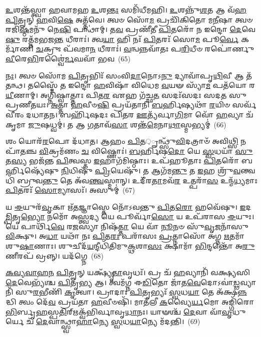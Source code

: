{\anuvakamend[{\-\ul{𑌯}\-𑌜𑍍𑌞𑌮\-\ul{𑌮𑍈}\-𑌰𑌧𑌿᳴ 𑌵𑍃\-\ul{𑌷}\-𑌨𑍍𑌨𑍇\-\ul{𑌕𑌾}\-𑌨𑍍𑌨𑌵𑌿𑍞᳴\-\ul{𑌶}\-𑌤𑌿𑌶𑍍𑌚᳴}]}%

\-\ul{𑌉}\-𑌶𑌨𑍍𑌤᳴𑌸𑍍𑌤𑍍𑌵𑌾 𑌹𑌵𑌾𑌮𑌹 \ul{𑌉}\-𑌶\-\ul{𑌨𑍍𑌤𑌃} 𑌸𑌮𑌿᳴𑌧𑍀𑌮𑌹𑌿। \ul{𑌉}\-𑌶𑌨𑍍𑌨𑍁᳴\-\ul{𑌶}\-𑌤 𑌆 𑌵᳴\-\ul{𑌹} \ul{𑌪𑌿}\-𑌤𑍄𑌨𑍍 \ul{𑌹}\-𑌵𑌿\-\ul{𑌷𑍇} 𑌅𑌤𑍍𑌤᳴𑌵𑍇। 𑌤𑍍𑌵𑍞 𑌸𑍋᳴\-\ul{𑌮} 𑌪𑍍𑌰𑌚𑌿᳴𑌕𑌿𑌤𑍋 𑌮\-\ul{𑌨𑍀}\-𑌷𑌾 𑌤𑍍𑌵𑍞 𑌰𑌜𑌿᳴\-\ul{𑌷𑍍𑌠}\-𑌮𑌨𑍁᳴ 𑌨𑍇\-\ul{𑌷𑌿} 𑌪𑌨𑍍𑌥𑌾॑𑌮𑍍। 𑌤\-\ul{𑌵} 𑌪𑍍𑌰𑌣𑍀᳴𑌤𑍀 \ul{𑌪𑌿}\-𑌤𑌰𑍋᳴ 𑌨 𑌇𑌨𑍍𑌦𑍋 \ul{𑌦𑍇}\-𑌵𑍇\-\ul{𑌷𑍁} 𑌰𑌤𑍍𑌨᳴𑌮𑌭𑌜\-\ul{𑌨𑍍𑌤} 𑌧𑍀𑌰𑌾𑌃॑। 𑌤𑍍𑌵\-\ul{𑌯𑌾} 𑌹𑌿 𑌨𑌃᳴ \ul{𑌪𑌿}\-𑌤𑌰𑌃᳴ 𑌸𑍋\-\ul{𑌮} 𑌪𑍂\-\ul{𑌰𑍍𑌵𑍇} 𑌕𑌰𑍍𑌮𑌾᳴𑌣𑌿 \ul{𑌚}\-𑌕𑍍𑌰𑍁𑌃 𑌪᳴𑌵𑌮𑌾\-\ul{𑌨} 𑌧𑍀𑌰𑌾𑌃॑। \ul{𑌵}\-𑌨𑍍𑌵𑌨𑍍𑌨𑌵𑌾᳴𑌤𑌃 𑌪\-\ul{𑌰𑌿}\-𑌧𑍀𑍞 𑌰𑌪𑍋॑𑌰𑍍𑌣𑍁 \ul{𑌵𑍀}\-𑌰𑍇\-\ul{𑌭𑌿}\-𑌰𑌶𑍍𑌵𑍈॑\-\ul{𑌰𑍍𑌮}\-𑌘𑌵𑌾᳴ 𑌭𑌵~(65)

\-\ul{𑌨𑌃}\-। 𑌤𑍍𑌵𑍞 𑌸𑍋᳴𑌮 \ul{𑌪𑌿}\-𑌤𑍃𑌭𑌿𑌃᳴ 𑌸𑌂𑌵𑌿\-\ul{𑌦𑌾}\-𑌨𑍋\-𑌽\-\ul{𑌨𑍁} 𑌦𑍍𑌯𑌾𑌵𑌾᳴𑌪𑍃\-\ul{𑌥𑌿}\-𑌵𑍀 𑌆 𑌤᳴𑌤𑌨𑍍𑌥। 𑌤𑌸𑍍𑌮𑍈᳴ 𑌤 𑌇𑌨𑍍𑌦𑍋 \ul{𑌹}\-𑌵𑌿𑌷𑌾᳴ 𑌵𑌿𑌧𑍇𑌮 \ul{𑌵}\-𑌯𑍟 𑌸𑍍𑌯𑌾᳴\-\ul{𑌮} 𑌪𑌤᳴𑌯𑍋 𑌰\-\ul{𑌯𑍀}\-𑌣𑌾𑌮𑍍। 𑌅𑌗𑍍𑌨𑌿᳴𑌷𑍍𑌵𑌾𑌤𑍍𑌤𑌾𑌃 𑌪𑌿𑌤\-\ul{𑌰} 𑌏𑌹 𑌗᳴𑌚𑍍𑌛\-\ul{𑌤} 𑌸𑌦𑌃᳴𑌸𑌦𑌃 𑌸𑌦𑌤 𑌸𑍁𑌪𑍍𑌰𑌣𑍀𑌤𑌯𑌃। \ul{𑌅}\-𑌤𑍍𑌤𑌾 \ul{𑌹}\-𑌵𑍀𑍞\-\ul{𑌷𑌿} 𑌪𑍍𑌰𑌯᳴𑌤𑌾𑌨𑌿 \ul{𑌬}\-𑌰𑍍\mbox{}𑌹𑌿𑌷𑍍𑌯𑌥𑌾᳴ \ul{𑌰}\-𑌯𑌿𑍞 𑌸𑌰𑍍𑌵᳴𑌵𑍀𑌰𑌂 𑌦𑌧𑌾𑌤𑌨। 𑌬𑌰𑍍\mbox{}𑌹𑌿᳴𑌷𑌦𑌃 𑌪𑌿𑌤𑌰 \ul{𑌊}\-𑌤𑍍𑌯᳴𑌰𑍍𑌵𑌾\-\ul{𑌗𑌿}\-𑌮𑌾 𑌵𑍋᳴ \ul{𑌹}\-𑌵𑍍𑌯𑌾 𑌚᳴𑌕𑍃𑌮𑌾 \ul{𑌜𑍁}\-𑌷𑌧𑍍𑌵𑌮𑍍॑। 𑌤 𑌆 \ul{𑌗}\-𑌤𑌾𑌵᳴\-\ul{𑌸𑌾} 𑌶𑌨𑍍𑌤᳴\-\ul{𑌮𑍇}\-𑌨𑌾\-\ul{𑌥𑌾}\-𑌸𑍍𑌮𑌭𑍍𑌯𑌮𑍍॑~(66)

𑌶𑌂 𑌯𑍋𑌰᳴\-\ul{𑌰}\-𑌪𑍋 𑌦᳴𑌧𑌾𑌤। 𑌆𑌹𑌂 \ul{𑌪𑌿}\-𑌤़𑍄𑌨𑍍𑌥𑍍𑌸𑍁᳴\-\ul{𑌵𑌿}\-𑌦𑌤𑍍𑌰𑌾𑍞᳴ 𑌅𑌵𑌿\-\ul{𑌥𑍍𑌸𑌿} 𑌨𑌪𑌾᳴𑌤𑌞𑍍𑌚 \ul{𑌵𑌿}\-𑌕𑍍𑌰𑌮᳴𑌣𑌂 \ul{𑌚} 𑌵𑌿𑌷𑍍𑌣𑍋𑌃॑। \ul{𑌬}\-𑌰𑍍\mbox{}\-\ul{𑌹𑌿}\-𑌷\-\ul{𑌦𑍋} 𑌯𑍇 \ul{𑌸𑍍𑌵}\-𑌧𑌯𑌾᳴ \ul{𑌸𑍁}\-𑌤\-\ul{𑌸𑍍𑌯} 𑌭𑌜᳴𑌨𑍍𑌤 \ul{𑌪𑌿}\-𑌤𑍍𑌵𑌸𑍍𑌤 \ul{𑌇}\-𑌹𑌾𑌗᳴𑌮𑌿𑌷𑍍𑌠𑌾𑌃। 𑌉𑌪᳴𑌹𑍂𑌤𑌾𑌃 \ul{𑌪𑌿}\-𑌤𑌰𑍋᳴ 𑌬𑌰𑍍\mbox{}\-\ul{𑌹𑌿}\-𑌷𑍍𑌯𑍇᳴𑌷𑍁 \ul{𑌨𑌿}\-𑌧𑌿𑌷𑍁᳴ \ul{𑌪𑍍𑌰𑌿}\-𑌯𑍇𑌷𑍁᳴। 𑌤 𑌆𑌗᳴𑌮\-\ul{𑌨𑍍𑌤𑍁} 𑌤 \ul{𑌇}\-𑌹 𑌶𑍍𑌰𑍁᳴\-\ul{𑌵}\-𑌨𑍍𑌤𑍍𑌵𑌧𑌿᳴ 𑌬𑍍𑌰𑍁𑌵\-\ul{𑌨𑍍𑌤𑍁} 𑌤𑍇 𑌅᳴𑌵\-\ul{𑌨𑍍𑌤𑍍𑌵}\-𑌸𑍍𑌮𑌾𑌨𑍍। 𑌉𑌦𑍀᳴𑌰\-\ul{𑌤𑌾}\-𑌮𑌵᳴\-\ul{𑌰} 𑌉𑌤𑍍𑌪𑌰𑌾᳴\-\ul{𑌸} 𑌉𑌨𑍍𑌮᳴\-\ul{𑌧𑍍𑌯}\-𑌮𑌾𑌃 \ul{𑌪𑌿}\-𑌤𑌰𑌃᳴ \ul{𑌸𑍋}\-𑌮𑍍𑌯𑌾𑌸𑌃᳴। 𑌅𑌸𑍁𑌮𑍍॑~(67)

𑌯 \ul{𑌈}\-𑌯𑍁𑌰᳴\-\ul{𑌵𑍃}\-𑌕𑌾 𑌋᳴\-\ul{𑌤}\-𑌜𑍍𑌞𑌾𑌸𑍍𑌤𑍇 𑌨𑍋᳴\-𑌽𑌵𑌨𑍍𑌤𑍁 \ul{𑌪𑌿}\-𑌤\-\ul{𑌰𑍋} 𑌹𑌵𑍇᳴𑌷𑍁। \ul{𑌇}\-𑌦\-\ul{𑌮𑍍𑌪𑌿}\-𑌤𑍃\-\ul{𑌭𑍍𑌯𑍋} 𑌨𑌮𑍋᳴ 𑌅\-\ul{𑌸𑍍𑌤𑍍𑌵}\-𑌦𑍍𑌯 𑌯𑍇 𑌪𑍂𑌰𑍍𑌵𑌾᳴\-\ul{𑌸𑍋} 𑌯 𑌉𑌪᳴𑌰𑌾𑌸 \ul{𑌈}\-𑌯𑍁𑌃। 𑌯𑍇 𑌪𑌾𑌰𑍍𑌥𑌿᳴\-\ul{𑌵𑍇} 𑌰\-\ul{𑌜}\-𑌸𑍍𑌯𑌾 𑌨𑌿𑌷᳴\-\ul{𑌤𑍍𑌤𑌾} 𑌯𑍇 𑌵𑌾᳴ \ul{𑌨𑍂}\-𑌨𑍞 𑌸𑍁᳴\-\ul{𑌵𑍃}\-𑌜𑌨𑌾᳴𑌸𑍁 \ul{𑌵𑌿}\-𑌕𑍍𑌷𑍁। 𑌅\-\ul{𑌧𑌾} 𑌯𑌥𑌾᳴ 𑌨𑌃 \ul{𑌪𑌿}\-𑌤\-\ul{𑌰𑌃} 𑌪𑌰𑌾᳴𑌸𑌃 \ul{𑌪𑍍𑌰}\-𑌤𑍍𑌨𑌾𑌸𑍋᳴ 𑌅𑌗𑍍𑌨 \ul{𑌋}\-𑌤𑌮𑌾᳴𑌶𑍁\-\ul{𑌷𑌾}\-𑌣𑌾𑌃। 𑌶𑍁𑌚𑍀𑌦᳴\-\ul{𑌯}\-𑌨𑍍𑌦𑍀𑌧𑌿᳴𑌤𑌿𑌮𑍁\-\ul{𑌕𑍍𑌥}\-𑌶𑌾\-\ul{𑌸𑌃} 𑌕𑍍𑌷𑌾𑌮𑌾᳴ \ul{𑌭𑌿}\-𑌨𑍍𑌦𑌨𑍍𑌤𑍋᳴ 𑌅\-\ul{𑌰𑍁}\-𑌣𑍀𑌰𑌪᳴ 𑌵𑍍𑌰𑌨𑍍𑌨𑍍। 𑌯𑌦᳴𑌗𑍍𑌨𑍇~(68)

\-\ul{𑌕}\-\-\ul{𑌵𑍍𑌯}\-\-\ul{𑌵𑌾}\-\-\ul{𑌹}\-\-\ul{𑌨} \ul{𑌪𑌿}\-𑌤𑍄𑌨𑍍 𑌯𑌕𑍍𑌷𑍍𑌯𑍃᳴\-\ul{𑌤𑌾}\-𑌵𑍃𑌧𑌃᳴। 𑌪𑍍𑌰 𑌚᳴ \ul{𑌹}\-𑌵𑍍𑌯𑌾𑌨𑌿᳴ 𑌵𑌕𑍍𑌷𑍍𑌯𑌸𑌿 \ul{𑌦𑍇}\-𑌵𑍇𑌭𑍍𑌯᳴𑌶𑍍𑌚 \ul{𑌪𑌿}\-𑌤𑍃\-\ul{𑌭𑍍𑌯} 𑌆। 𑌤𑍍𑌵𑌮᳴𑌗𑍍𑌨 𑌈\-\ul{𑌡𑌿}\-𑌤𑍋 𑌜𑌾᳴𑌤\-\ul{𑌵𑍇}\-𑌦𑍋\-𑌽𑌵𑌾॑\-\ul{𑌡𑍍𑌢}\-𑌵𑍍𑌯𑌾𑌨𑌿᳴ 𑌸𑍁\-\ul{𑌰}\-𑌭𑍀𑌣𑌿᳴ \ul{𑌕𑍃}\-𑌤𑍍𑌵𑌾। 𑌪𑍍𑌰𑌾𑌦𑌾𑌃॑ \ul{𑌪𑌿}\-𑌤𑍃𑌭𑍍𑌯𑌃᳴ \ul{𑌸𑍍𑌵}\-𑌧\-\ul{𑌯𑌾} 𑌤𑍇 𑌅᳴𑌕𑍍𑌷\-\ul{𑌨𑍍𑌨}\-𑌦𑍍𑌧𑌿 𑌤𑍍𑌵𑌂 𑌦𑍇᳴\-\ul{𑌵} 𑌪𑍍𑌰𑌯᳴𑌤𑌾 \ul{𑌹}\-𑌵𑍀𑍞𑌷𑌿᳴। 𑌮𑌾𑌤᳴𑌲𑍀 \ul{𑌕}\-𑌵𑍍𑌯𑍈\-\ul{𑌰𑍍𑌯}\-𑌮𑍋 𑌅𑌙𑍍𑌗𑌿᳴𑌰𑍋\-\ul{𑌭𑌿}\-𑌰𑍍𑌬𑍃\-\ul{𑌹}\-𑌸𑍍𑌪\-\ul{𑌤𑌿}\-𑌰𑍍\mbox{}𑌋𑌕𑍍𑌵᳴𑌭𑌿𑌰𑍍𑌵𑌾𑌵𑍃\-\ul{𑌧𑌾}\-𑌨𑌃। 𑌯𑌾𑍟𑌶𑍍𑌚᳴ \ul{𑌦𑍇}\-𑌵𑌾 𑌵𑌾᳴\-\ul{𑌵𑍃}\-𑌧𑍁𑌰𑍍𑌯𑍇 𑌚᳴ \ul{𑌦𑍇}\-𑌵𑌾𑌨𑍍𑌥𑍍𑌸𑍍𑌵𑌾\-\ul{𑌹𑌾}\-𑌨𑍍𑌯𑍇 \ul{𑌸𑍍𑌵}\-𑌧\-\ul{𑌯𑌾}\-𑌨𑍍𑌯𑍇 𑌮᳴𑌦𑌨𑍍𑌤𑌿।~(69)

